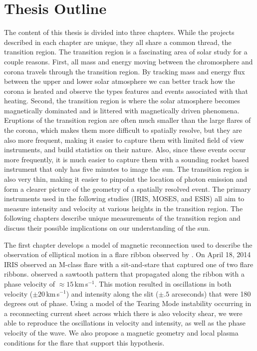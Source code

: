 \section{Thesis Outline}
The content of this thesis is divided into three chapters.  
While the projects described in each chapter are unique, they all share a common thread, the transition region.
The transition region is a fascinating area of solar study for a couple reasons.
First, all mass and energy moving between the chromosphere and corona travels through the transition region.
By tracking mass and energy flux between the upper and lower solar atmosphere we can better track how the corona is heated and observe the types features and events associated with that heating.
Second, the transition region is where the solar atmosphere becomes magnetically dominated and is littered with magnetically driven phenomena.
Eruptions of the transition region are often much smaller than the large flares of the corona, which makes them more difficult to spatially resolve, but they are also more frequent, making it easier to capture them with limited field of view instruments, and build statistics on their nature.
Also, since these events occur more frequently, it is much easier to capture them with a sounding rocket based instrument that only has five minutes to image the sun.
The transition region is also very thin, making it easier to pinpoint the location of photon emission and form a clearer picture of the geometry of a spatially resolved event. 
The primary instruments used in the following studies (IRIS, MOSES, and ESIS) all aim to measure intensity and velocity at various heights in the transition region.
The following chapters describe unique measurements of the transition region and discuss their possible implications on our understanding of the sun.

The first chapter develops a model of magnetic reconnection used to describe the observation of elliptical motion in a flare ribbon observed by \citet{Brannon2015}.
On April 18, 2014 IRIS observed an M-class flare with a sit-and-stare that captured one of two flare ribbons.
\citet{Brannon2015} observed a sawtooth pattern that propagated along the ribbon with a phase velocity of $\approx15$\,km\,s$^{-1}$.
This motion resulted in oscillations in both velocity ($\pm20$\,km\,s$^{-1}$) and intensity along the slit ($\pm.5$ arcseconds) that were 180 degrees out of phase.
Using a model of the Tearing Mode instability \citep{FKR} occurring in a reconnecting current sheet across which there is also velocity shear, we were able to reproduce the oscillations in velocity and intensity, as well as the phase velocity of the wave.
We also propose a magnetic geometry and local plasma conditions for the flare that support this hypothesis.

